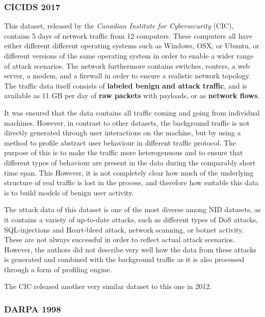 \documentclass[a4paper,12pt,twoside]{report}
\begin{document}
\subsubsection*{CICIDS 2017 \cite{gharib2016evaluation}\cite{sharafaldin2018towards}}

This dataset, released by the \textit{Canadian Institute for Cybersecurity} (CIC), contains 5 days of network traffic from 12 computers. These computers all have either different different operating systems such as Windows, OSX, or Ubuntu, or different versions of the same operating system in order to enable a wider range of attack scenarios. The network  furthermore contains switches, routers, a web server, a modem, and a firewall in order to ensure a realistic network topology. The traffic data itself consists of \textbf{labeled benign and attack traffic}, and is available as 11 GB per day of \textbf{raw packets} with payloads, or as \textbf{network flows}. 

It was ensured that the data contains all traffic coming and going from individual machines. However, in contrast to other datasets, the background traffic is not directly generated through user interactions on the machine, but by using a method to profile abstract user behaviour in different traffic protocol. The purpose of this is to make the traffic more heterogenuous and to ensure that different types of behaviour are present in the data during the comparably short time span. This  However, it is not completely clear how much of the underlying structure of real traffic is lost in the process, and therefore how suitable this data is to build models of benign user activity.

The attack data of this dataset is one of the most diverse among NID datasets, as it contains a variety of up-to-date attacks, such as different types of DoS attacks, SQL-injections and Heart-bleed attack, network scanning, or botnet activity. These are not always successful in order to reflect actual attack scenarios. However, the authors did not describe very well how the data from these attacks is generated and combined with the background traffic as it is also processed through a form of profiling engine. 

The CIC released another very similar dataset to this one in 2012.

\subsubsection*{DARPA 1998 \cite{lippmann2000evaluating}}
\end{document}
